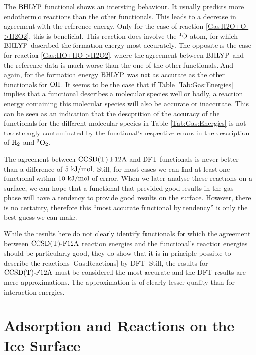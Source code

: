 \documentclass[8.5pt,twoside,twocolumn]{article}
\newcommand\singo{\enmat{{^1\te{O}}}}
\newcommand\tripot{\enmat{{^3\ot}}}
\newcommand\kmo{\enmat{\te {kJ/mol}}}
\theoremstyle{standard}
\begin{document}
The $\text{BHLYP}$ functional shows an intersting behaviour. It usually
predicts more endothermic reactions than the other functionals.
This leads to a decrease in agreement with the reference energy.
Only for the case of reaction \eqref{Gas:H2O+O->H2O2}, this is beneficial. This
reaction does involve the $\singo$ atom, for which $\text{BHLYP}$ described the
formation energy most accurately. The opposite is the case for reaction
\eqref{Gas:HO+HO->H2O2}, where the agreement between $\text{BHLYP}$ and the reference
data is much worse than the one of the other functionals. And again, for the
formation energy $\text{BHLYP}$ was not as accurate as the other functionals for
$\text O \text H$. It seems to be the case that if Table \ref{Tab:Gas:Energies} implies
that a functional describes a molecular species well or badly, a reaction
energy containing this molecular species will also be accurate or inaccurate.
This can be seen as an indication that the descprition of the accuracy of the
functionals for the different molecular species in Table \ref{Tab:Gas:Energies}
is not too strongly contaminated by the functional's respective errors in the
description of $\text H_2$ and $\tripot$.

The agreement between $\text{CCSD(T)-F12A}$ and DFT functionals is never better than a
difference of $5~\kmo$. Still, for most cases we can find at least one
functional within $10~\kmo$ of errror. When we later analyse these reactions on
a surface, we can hope that a functional that provided good results in the
gas phase will have a tendency to provide good results on the surface. However,
there is no certainty, therefore this ``most accurate functional by tendency'' is
only the best guess we can make. 

While the results here do not clearly identify functionals for which the
agreement between $\text{CCSD(T)-F12A}$ reaction energies and the functional's reaction
energies should be particularly good, they do show that it is in
principle possible to describe the reactions \eqref{Gas:Reactions} by DFT.
Still, the results for $\text{CCSD(T)-F12A}$ must be considered the most accurate
and the DFT results are mere approximations. The approximation is of
clearly lesser quality than for interaction energies.

\section{Adsorption and Reactions on the Ice Surface}
\label{Sec:Ads}
\newcommand\hoht{\enmat{\te{HO}+\te H_2}}
\end{document}
